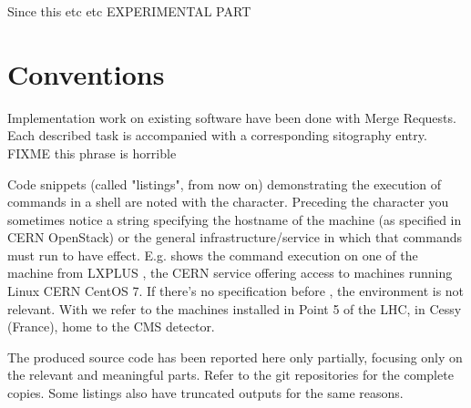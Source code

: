 Since this etc etc EXPERIMENTAL PART

\section{Conventions}

Implementation work on existing software have been done with Merge Requests. Each described task is accompanied with a corresponding sitography entry. FIXME this phrase is horrible

Code snippets (called "listings", from now on) demonstrating the execution of commands in a shell are noted with the \mcode{\$} character. Preceding the \mcode{\$} character you sometimes notice a string specifying the hostname of the machine (as specified in CERN OpenStack) or the general infrastructure/service in which that commands must run to have effect. E.g.  shows the command execution on one of the machine from LXPLUS \cite{LXPLUSServiceITDepartment-2020-10-01}, the CERN service offering access to machines running Linux CERN CentOS 7. If there's no specification before \mcode{\$}, the environment is not relevant. With  we refer to the machines installed in Point 5 of the LHC, in Cessy (France), home to the CMS detector.

The produced source code has been reported here only partially, focusing only on the relevant and meaningful parts. Refer to the git repositories for the complete copies. Some listings also have truncated outputs for the same reasons.
